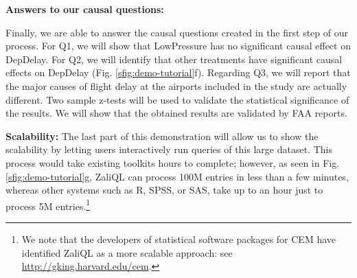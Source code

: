 {\bf Answers to our causal questions:}
Finally, we are able to answer the causal questions created in the first step of our process. For Q1, we will show that LowPressure has no significant causal effect on DepDelay. For Q2, we will identify that other treatments have significant causal effects on DepDelay (Fig. \ref{sfig:demo-tutorial}f). Regarding Q3, we will report that the major causes of flight delay at the airports included in the study are actually different. Two sample z-tests will be used to validate the statistical significance of the results. We will show that the obtained results are validated by FAA reports.

{\bf Scalability:} The last part of this demonstration will allow us to show the scalability by letting users interactively run queries of this large dataset. This process would take existing toolkits hours to complete; however, as seen in Fig. \ref{sfig:demo-tutorial}g, ZaliQL can process 100M entries in less than a few minutes, whereas other systems such as R, SPSS, or SAS, take up to an hour just to process 5M entries.\footnote{We note that the developers of statistical software packages for CEM have identified ZaliQL as a more scalable approach: see \url{http://gking.harvard.edu/cem}.}


